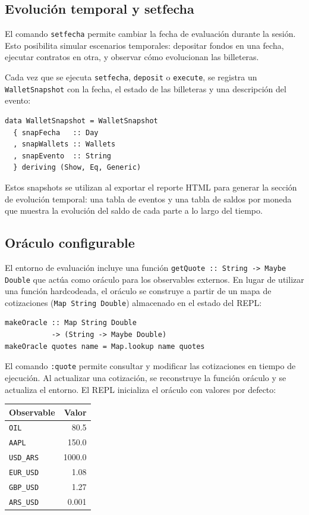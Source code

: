\documentclass[a4paper, 12pt]{article}
\begin{document}
\subsection{Evolución temporal y setfecha}

El comando \texttt{setfecha} permite cambiar la fecha de evaluación durante la sesión. Esto posibilita simular escenarios temporales: depositar fondos en una fecha, ejecutar contratos en otra, y observar cómo evolucionan las billeteras.

Cada vez que se ejecuta \texttt{setfecha}, \texttt{deposit} o \texttt{execute}, se registra un \texttt{WalletSnapshot} con la fecha, el estado de las billeteras y una descripción del evento:

\begin{lstlisting}[caption={Snapshot temporal (Types.hs)}]
data WalletSnapshot = WalletSnapshot
  { snapFecha   :: Day
  , snapWallets :: Wallets
  , snapEvento  :: String
  } deriving (Show, Eq, Generic)
\end{lstlisting}

Estos snapshots se utilizan al exportar el reporte HTML para generar la sección de evolución temporal: una tabla de eventos y una tabla de saldos por moneda que muestra la evolución del saldo de cada parte a lo largo del tiempo.

\subsection{Oráculo configurable}

El entorno de evaluación incluye una función \texttt{getQuote :: String -> Maybe Double} que actúa como oráculo para los observables externos. En lugar de utilizar una función hardcodeada, el oráculo se construye a partir de un mapa de cotizaciones (\texttt{Map String Double}) almacenado en el estado del REPL:

\begin{lstlisting}[caption={Construcción del oráculo (Main.hs)}]
makeOracle :: Map String Double
           -> (String -> Maybe Double)
makeOracle quotes name = Map.lookup name quotes
\end{lstlisting}

El comando \texttt{:quote} permite consultar y modificar las cotizaciones en tiempo de ejecución. Al actualizar una cotización, se reconstruye la función oráculo y se actualiza el entorno. El REPL inicializa el oráculo con valores por defecto:

\begin{center}
\begin{tabular}{l r}
\toprule
\textbf{Observable} & \textbf{Valor} \\
\midrule
\texttt{OIL} & 80.5 \\
\texttt{AAPL} & 150.0 \\
\texttt{USD\_ARS} & 1000.0 \\
\texttt{EUR\_USD} & 1.08 \\
\texttt{GBP\_USD} & 1.27 \\
\texttt{ARS\_USD} & 0.001 \\
\bottomrule
\end{tabular}
\end{center}
\end{document}
